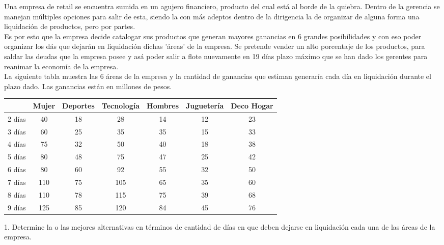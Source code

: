 Una empresa de retail se encuentra sumida en un agujero financiero, producto del cual está al
borde de la quiebra. Dentro de la gerencia se manejan múltiples opciones para salir de esta, siendo
la con más adeptos dentro de la dirigencia la de organizar de alguna forma una liquidación de productos, pero por partes.\\

Es por esto que la empresa decide catalogar sus productos que generan mayores ganancias en 6
grandes posibilidades y con eso poder organizar los dás que dejarán en liquidación dichas ’áreas’
de la empresa. Se pretende vender un alto porcentaje de los productos, para saldar las deudas que
la empresa posee y asá poder salir a flote nuevamente en 19 días plazo máximo que se han dado los gerentes para reanimar la economía de la empresa.\\

La siguiente tabla muestra las 6  áreas de la empresa y la cantidad de ganancias que estiman generaría cada día en liquidación durante el plazo dado. Las ganancias están en millones de pesos.\\

\begin{center}

\begin{tabular}{ c | c  c  c  c  c  c |}
	& Mujer & Deportes & Tecnología & Hombres & Juguetería & Deco Hogar\\
\hline
2 días & 40 & 18 & 28 & 14 & 12 & 23\\
3 días & 60 & 25 & 35 & 35 & 15 & 33 \\ 
4 días & 75 & 32 & 50 & 40 & 18 & 38 \\ 
5 días & 80 & 48 & 75 & 47 & 25 & 42 \\ 
6 días & 80 & 60 & 92 & 55 & 32 & 50 \\ 
7 días & 110 & 75 & 105 & 65 & 35 & 60 \\ 
8 días & 110 & 78 & 115 & 75 & 39 & 68 \\ 
9 días & 125 & 85 & 120 & 84 & 45 & 76 \\ 
\end{tabular}
\end{center}

1. Determine la o las mejores alternativas en términos de cantidad de días en que deben dejarse 
\hspace*{0.9cm}en liquidación cada una de las áreas de la empresa.

